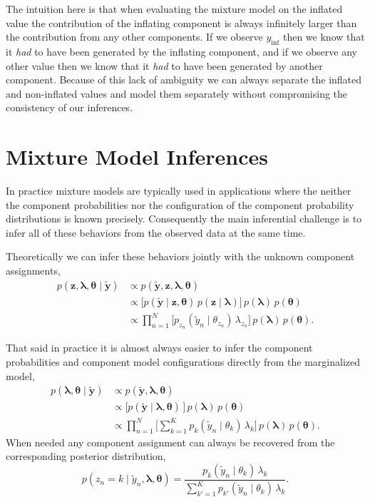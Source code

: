 \documentclass[
  letterpaper,
  DIV=11,
  numbers=noendperiod]{scrartcl}
\begin{document}
The intuition here is that when evaluating the mixture model on the
inflated value the contribution of the inflating component is always
infinitely larger than the contribution from any other components. If we
observe \(y_{\mathrm{inf}}\) then we know that it \emph{had} to have
been generated by the inflating component, and if we observe any other
value then we know that it \emph{had} to have been generated by another
component. Because of this lack of ambiguity we can always separate the
inflated and non-inflated values and model them separately without
compromising the consistency of our inferences.

\section{Mixture Model Inferences}\label{mixture-model-inferences}

In practice mixture models are typically used in applications where the
neither the component probabilities nor the configuration of the
component probability distributions is known precisely. Consequently the
main inferential challenge is to infer all of these behaviors from the
observed data at the same time.

Theoretically we can infer these behaviors jointly with the unknown
component assignments, \begin{align*}
p(\mathbf{z}, \boldsymbol{\lambda}, \boldsymbol{\theta}
 \mid \tilde{\mathbf{y}} )
&\propto
p(\tilde{\mathbf{y}}, \mathbf{z},
  \boldsymbol{\lambda}, \boldsymbol{\theta} )
\\
&\propto
\bigg[
p(\tilde{\mathbf{y}} \mid \mathbf{z}, \boldsymbol{\theta} ) \,
p( \mathbf{z} \mid \boldsymbol{\lambda} )
\bigg] \,
p( \boldsymbol{\lambda} ) \, p( \boldsymbol{\theta} )
\\
&\propto
\prod_{n = 1}^{N} \bigg[
p_{z_{n}}(\tilde{y}_{n} \mid \theta_{z_{n}} ) \, \lambda_{z_{n}}
\bigg] \,
p( \boldsymbol{\lambda} ) \, p( \boldsymbol{\theta} ).
\end{align*}

That said in practice it is almost always easier to infer the component
probabilities and component model configurations directly from the
marginalized model, \begin{align*}
p(\boldsymbol{\lambda}, \boldsymbol{\theta}
 \mid \tilde{\mathbf{y}} )
&\propto
p(\tilde{\mathbf{y}}, \boldsymbol{\lambda}, \boldsymbol{\theta} )
\\
&\propto
\bigg[
p(\tilde{\mathbf{y}} \mid \boldsymbol{\lambda}, \boldsymbol{\theta} ) \,
\bigg] \,
p( \boldsymbol{\lambda} ) \, p( \boldsymbol{\theta} )
\\
&\propto
\prod_{n = 1}^{N} \bigg[ \sum_{k = 1}^{K}
p_{k}(\tilde{y}_{n} \mid \theta_{k} ) \, \lambda_{k}
\bigg] \,
p( \boldsymbol{\lambda} ) \, p( \boldsymbol{\theta} ).
\end{align*} When needed any component assignment can always be
recovered from the corresponding posterior distribution, \[
p(z_{n} = k \mid
  \tilde{y}_{n}, \boldsymbol{\lambda}, \boldsymbol{\theta})
=
\frac{
p_{k}(\tilde{y}_{n} \mid \theta_{k}) \, \lambda_{k}
}{
\sum_{k' = 1}^{K} p_{k'}(\tilde{y}_{n} \mid \theta_{k}) \, \lambda_{k}
}.
\]
\end{document}
